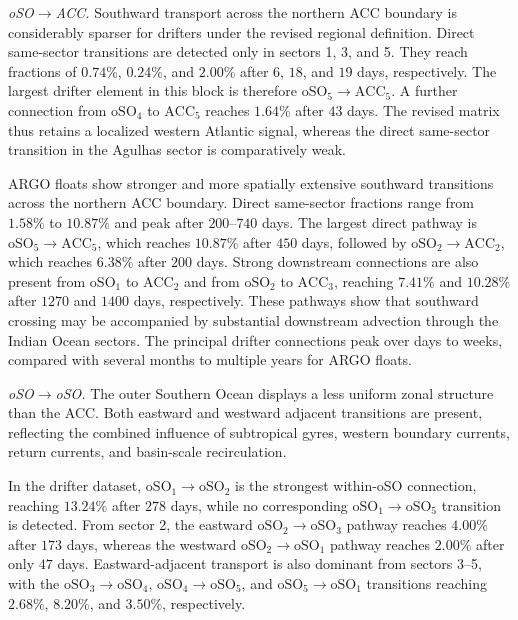 \documentclass[
  draft
]{agujournal2025}
\begin{document}
                \medskip
                \noindent
                \textit{oSO$\boldsymbol{\rightarrow}$ACC.}
                Southward transport across the northern ACC boundary is considerably sparser for drifters under the revised regional definition. Direct same-sector transitions are detected only in sectors 1, 3, and 5. They reach fractions of $0.74 \%$, $0.24 \%$, and $2.00 \%$ after $6$, $18$, and $19$ days, respectively. The largest drifter element in this block is therefore $\mathrm{oSO}_5 \rightarrow \mathrm{ACC}_5$. A further connection from $\mathrm{oSO}_4$ to $\mathrm{ACC}_5$ reaches $1.64 \%$ after $43$ days. The revised matrix thus retains a localized western Atlantic signal, whereas the direct same-sector transition in the Agulhas sector is comparatively weak.
    
                ARGO floats show stronger and more spatially extensive southward transitions across the northern ACC boundary. Direct same-sector fractions range from $1.58 \%$ to $10.87 \%$ and peak after $200$--$740$ days. The largest direct pathway is $\mathrm{oSO}_5 \rightarrow \mathrm{ACC}_5$, which reaches $10.87 \%$ after $450$ days, followed by $\mathrm{oSO}_2 \rightarrow \mathrm{ACC}_2$, which reaches $6.38 \%$ after $200$ days. Strong downstream connections are also present from $\mathrm{oSO}_1$ to $\mathrm{ACC}_2$ and from $\mathrm{oSO}_2$ to $\mathrm{ACC}_3$, reaching $7.41 \%$ and $10.28 \%$ after $1270$ and $1400$ days, respectively. These pathways show that southward crossing may be accompanied by substantial downstream advection through the Indian Ocean sectors. The principal drifter connections peak over days to weeks, compared with several months to multiple years for ARGO floats.
    
                \medskip
                \noindent
                \textit{oSO$\boldsymbol{\rightarrow}$oSO.}
                The outer Southern Ocean displays a less uniform zonal structure than the ACC. Both eastward and westward adjacent transitions are present, reflecting the combined influence of subtropical gyres, western boundary currents, return currents, and basin-scale recirculation.
    
                In the drifter dataset, $\mathrm{oSO}_1 \rightarrow \mathrm{oSO}_2$ is the strongest within-oSO connection, reaching $13.24 \%$ after $278$ days, while no corresponding $\mathrm{oSO}_1 \rightarrow \mathrm{oSO}_5$ transition is detected. From sector 2, the eastward $\mathrm{oSO}_2 \rightarrow \mathrm{oSO}_3$ pathway reaches $4.00 \%$ after $173$ days, whereas the westward $\mathrm{oSO}_2 \rightarrow \mathrm{oSO}_1$ pathway reaches $2.00 \%$ after only $47$ days. Eastward-adjacent transport is also dominant from sectors 3--5, with the $\mathrm{oSO}_3 \rightarrow \mathrm{oSO}_4$, $\mathrm{oSO}_4 \rightarrow \mathrm{oSO}_5$, and $\mathrm{oSO}_5 \rightarrow \mathrm{oSO}_1$ transitions reaching $2.68 \%$, $8.20 \%$, and $3.50 \%$, respectively.
    
\end{document}
